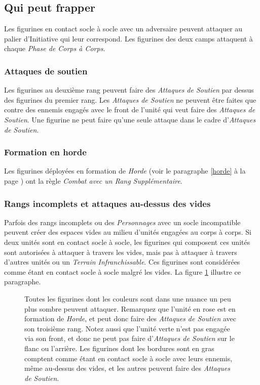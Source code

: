 \subsection{Qui peut frapper}

Les figurines en contact socle à socle avec un adversaire peuvent attaquer au palier d'Initiative qui leur correspond. Les figurines des deux camps attaquent à chaque \emph{Phase de Corps à Corps}.

\subsubsection*{Attaques de soutien}

Les figurines au deuxième rang peuvent faire des \emph{Attaques de Soutien} par dessus des figurines du premier rang. Les \emph{Attaques de Soutien} ne peuvent être faites que contre des ennemis engagés avec le front de l'unité qui veut faire des \emph{Attaques de Soutien}. Une figurine ne peut faire qu'une seule attaque dans le cadre d'\emph{Attaques de Soutien}.

\subsubsection*{Formation en horde}

Les figurines déployées en formation de \emph{Horde} (voir le paragraphe \ref{horde} à la page \pageref{horde}) ont la règle \emph{Combat avec un Rang Supplémentaire}.

\subsubsection*{Rangs incomplets et attaques au-dessus des vides}

Parfois des rangs incomplets ou des \emph{Personnages} avec un socle incompatible peuvent créer des espaces vides au milieu d'unités engagées au corps à corps. Si deux unités sont en contact socle à socle, les figurines qui composent ces unités sont autorisées à attaquer à travers les vides, mais pas à attaquer à travers d'autres unités ou un \emph{Terrain Infranchissable}. Ces figurines sont considérées comme étant en contact socle à socle malgré les vides. La figure \ref{figure/combat_vides} illustre ce paragraphe.

\begin{figure}[!htbp]
\centering
\def\svgwidth{8cm}

\caption{Toutes les figurines dont les couleurs sont dans une nuance un peu plus sombre peuvent attaquer. Remarquez que l'unité en rose est en formation de \emph{Horde}, et peut donc faire des \emph{Attaques de Soutien} avec son troisième rang. Notez aussi que l'unité verte n'est pas engagée via son front, et donc ne peut pas faire d'\emph{Attaques de Soutien} sur le flanc ou l'arrière. Les figurines dont les bordures sont en gras comptent comme étant en contact socle à socle avec leurs ennemis, même au-dessus des vides, et les autres peuvent faire des \emph{Attaques de Soutien}.}
\label{figure/combat_vides}
\end{figure}

